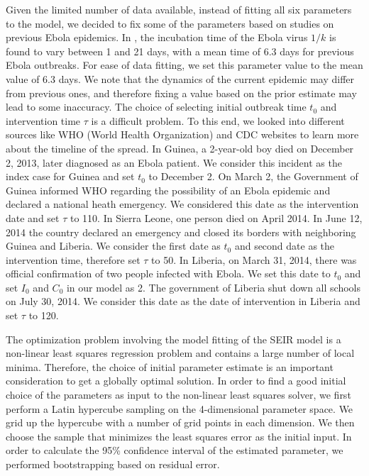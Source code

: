\documentclass[10pt, journal,onecolumn]{IEEEtran}
\begin{document}
Given the limited number of data available, instead of fitting all six parameters to the model, we
decided to fix some of the parameters based on studies on previous Ebola epidemics. In
\citep{chowell2004basic}, the incubation time of the Ebola virus $1/k$ is found to vary between 1
and 21 days, with a mean time of 6.3 days for previous Ebola outbreaks. For ease of data fitting, we
set this parameter value to the mean value of 6.3 days. We note that the dynamics of the current
epidemic may differ from previous ones, and therefore fixing a value based on the prior estimate may
lead to some inaccuracy.  The choice of selecting initial outbreak time $t_0$ and intervention time
$\tau$ is a difficult problem. To this end, we looked into different sources like WHO (World Health
Organization) and CDC websites to learn more about the timeline of the spread. In Guinea, a
2-year-old boy died on December 2, 2013, later diagnosed as an Ebola patient. We consider this
incident as the index case for Guinea and set $t_0$ to December 2. On March 2, the Government of
Guinea informed WHO regarding the possibility of an Ebola epidemic and declared a national heath
emergency. We considered this date as the intervention date and set $\tau$ to 110. In Sierra Leone,
one person died on April 2014. In June 12, 2014 the country declared an emergency and closed its
borders with neighboring Guinea and Liberia. We consider the first date as $t_0$ and second date as
the intervention time, therefore set $\tau$ to 50. In Liberia, on March 31, 2014, there was official
confirmation of two people infected with Ebola. We set this date to $t_0$ and set $I_0$ and $C_0$ in
our model as 2. The government of Liberia shut down all schools on July 30, 2014. We consider this
date as the date of intervention in Liberia and set $\tau$ to 120.


The optimization problem involving the model fitting of the SEIR model is a non-linear least squares
regression problem and contains a large number of local minima. Therefore, the choice of initial
parameter estimate is an important consideration to get a globally optimal solution. In order to
find a good initial choice of the parameters as input to the non-linear least squares solver, we
first perform a Latin hypercube sampling on the  4-dimensional parameter space.  We grid up the
hypercube with a number of grid points in each dimension.  We then choose the sample that minimizes
the least squares error as the initial input. In order to calculate the 95\% confidence interval of
the estimated parameter, we performed bootstrapping based on residual error.
\end{document}
